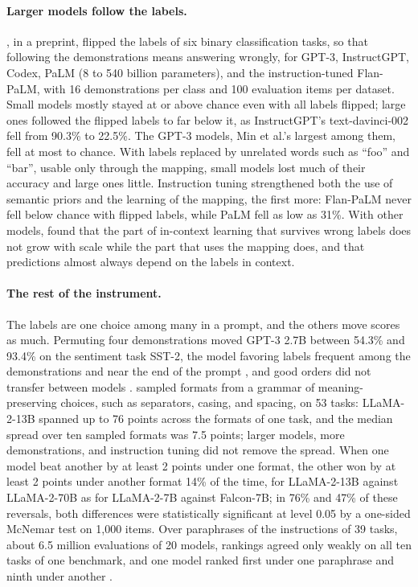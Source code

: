 \begin{refsection}
\paragraph{Larger models follow the labels.} \Textcite{WeiEtAl2023larger}, in a preprint, flipped the labels of six binary classification tasks, so that following the demonstrations means answering wrongly, for GPT-3, InstructGPT, Codex, PaLM (8 to 540 billion parameters), and the instruction-tuned Flan-PaLM, with 16 demonstrations per class and 100 evaluation items per dataset. Small models mostly stayed at or above chance even with all labels flipped; large ones followed the flipped labels to far below it, as InstructGPT's text-davinci-002 fell from 90.3\% to 22.5\%. The GPT-3 models, Min et al.'s largest among them, fell at most to chance. With labels replaced by unrelated words such as \enquote{foo} and \enquote{bar}, usable only through the mapping, small models lost much of their accuracy and large ones little. Instruction tuning strengthened both the use of semantic priors and the learning of the mapping, the first more: Flan-PaLM never fell below chance with flipped labels, while PaLM fell as low as 31\%. With other models, \textcite{PanEtAl2023} found that the part of in-context learning that survives wrong labels does not grow with scale while the part that uses the mapping does, and \textcite{KossenGalRainforth2024} that predictions almost always depend on the labels in context.

\paragraph{The rest of the instrument.} The labels are one choice among many in a prompt, and the others move scores as much. Permuting four demonstrations moved GPT-3 2.7B between 54.3\% and 93.4\% on the sentiment task SST-2, the model favoring labels frequent among the demonstrations and near the end of the prompt \parencite{ZhaoEtAl2021}, and good orders did not transfer between models \parencite{LuEtAl2022}. \Textcite{SclarEtAl2024} sampled formats from a grammar of meaning-preserving choices, such as separators, casing, and spacing, on 53 tasks: LLaMA-2-13B spanned up to 76 points across the formats of one task, and the median spread over ten sampled formats was 7.5 points; larger models, more demonstrations, and instruction tuning did not remove the spread. When one model beat another by at least 2 points under one format, the other won by at least 2 points under another format 14\% of the time, for LLaMA-2-13B against LLaMA-2-70B as for LLaMA-2-7B against Falcon-7B; in 76\% and 47\% of these reversals, both differences were statistically significant at level 0.05 by a one-sided McNemar test on 1,000 items. Over paraphrases of the instructions of 39 tasks, about 6.5 million evaluations of 20 models, rankings agreed only weakly on all ten tasks of one benchmark, and one model ranked first under one paraphrase and ninth under another \parencite{MizrahiEtAl2024}.


\end{refsection}
